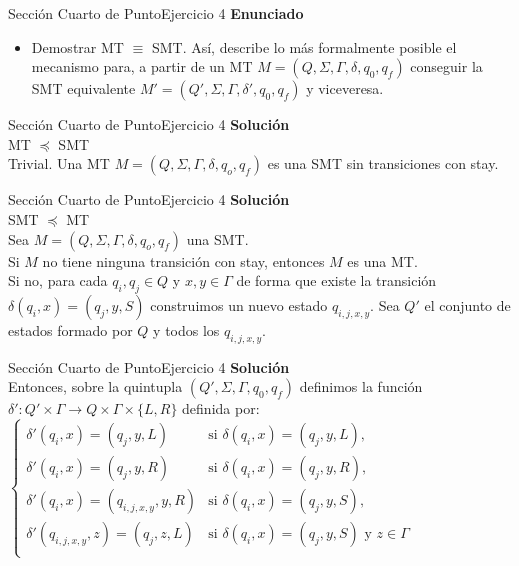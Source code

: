 \documentclass[10pt, envcountsect, presentation, aspectratio=169]{beamer}
\begin{document}

\begin{frame}{Sección Cuarto de Punto}{Ejercicio 4}
\textbf{Enunciado}
	\begin{itemize}
        \item Demostrar MT $\equiv$ SMT. Así, describe lo más formalmente posible el mecanismo para, a partir de un MT $M=(Q,\Sigma,\Gamma,\delta,q_0,q_f)$ conseguir la SMT equivalente $M'=(Q',\Sigma,\Gamma,\delta',q_0,q_f)$ y viceveresa.
	\end{itemize}
\end{frame}


\begin{frame}{Sección Cuarto de Punto}{Ejercicio 4}
    \textbf{Solución}\\
    MT $\preceq$ SMT\\
    Trivial. Una MT $M=(Q,\Sigma,\Gamma,\delta,q_o,q_f)$ es una SMT sin transiciones con stay.
\end{frame}


\begin{frame}{Sección Cuarto de Punto}{Ejercicio 4}
    \textbf{Solución}\\
    SMT $\preceq$ MT\\
    Sea $M=(Q,\Sigma,\Gamma,\delta,q_o,q_f)$ una SMT.\\ 
    Si $M$ no tiene ninguna transición con stay, entonces $M$ es una MT.\\
    Si no, para cada $q_i,q_j \in Q$ y $x,y \in \Gamma$ de forma que existe la transición $\delta(q_i,x)=(q_j,y,S)$ construimos un nuevo estado $q_{i,j,x,y}$.
    Sea $Q'$ el conjunto de estados formado por $Q$ y todos los $q_{i,j,x,y}$.
\end{frame}


\begin{frame}{Sección Cuarto de Punto}{Ejercicio 4}
    \textbf{Solución}\\
    Entonces, sobre la quintupla $(Q',\Sigma,\Gamma,q_0,q_f)$ definimos la función $\delta':Q' \times \Gamma \rightarrow Q \times \Gamma \times \{L,R\}$ definida por:\\
    $\begin{cases}
        \delta'(q_i,x) = (q_j,y,L) & \text{si } \delta(q_i,x) = (q_j,y,L),\\
        \delta'(q_i,x) = (q_j,y,R) & \text{si } \delta(q_i,x) = (q_j,y,R),\\
        \delta'(q_i,x) = (q_{i,j,x,y},y,R) & \text{si } \delta(q_i,x) = (q_j,y,S),\\
        \delta'(q_{i,j,x,y},z) = (q_j,z,L) & \text{si } \delta(q_i,x) = (q_j,y,S) \text{ y } z \in \Gamma\\
    \end{cases}$
\end{frame}
\end{document}
